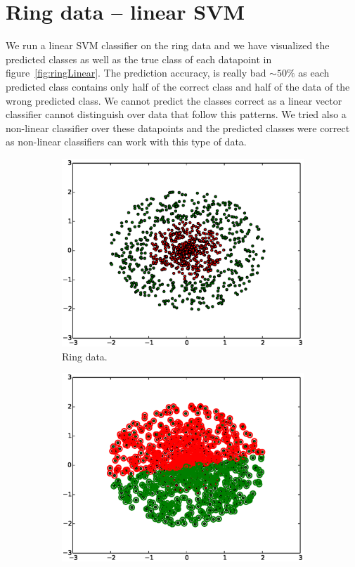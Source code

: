\documentclass[a4paper,10pt]{article}
\begin{document}
\section{Ring data -- linear SVM}
We run a linear SVM classifier on the ring data and we have visualized the predicted classes as well as the true class of each datapoint in figure~\ref{fig:ringLinear}. The prediction accuracy, is really bad $\sim 50\%$ as each predicted class contains only half of the correct class and half of the data of the wrong predicted class. We cannot predict the classes correct as a linear vector classifier cannot distinguish over data that follow this patterns. We tried also a non-linear classifier over these datapoints and the predicted classes were correct as non-linear classifiers can work with this type of data.
\begin{figure}[ht!]
    \centering
    \begin{subfigure}{.49\textwidth}
    \includegraphics[width=1.00\textwidth]{ringData.eps}
    \caption{Ring data.}
    \end{subfigure}
    \begin{subfigure}{.49\textwidth}
    \includegraphics[width=1.00\textwidth]{ringLinearFit.eps}

\end{subfigure}
\end{figure}
\end{document}
